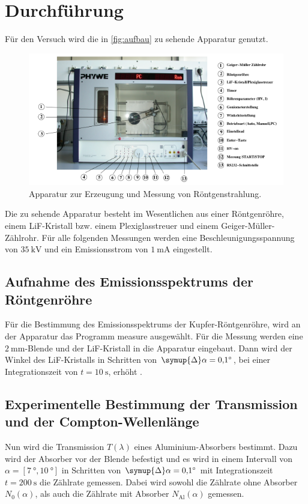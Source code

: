 \section{Durchführung}
\label{sec:Durchführung}
Für den Versuch wird die in \autoref{fig:aufbau} zu sehende Apparatur genutzt.
\begin{figure}[H]
    \centering
    \includegraphics[width=\textwidth]{images/aufbau.PNG}
    \caption{Apparatur zur Erzeugung und Messung von Röntgenstrahlung. \cite{603}}
    \label{fig:aufbau}
\end{figure}
\noindent Die zu sehende Apparatur besteht im Wesentlichen aus einer Röntgenröhre,
einem LiF-Kristall bzw. einem Plexiglasstreuer und einem Geiger-Müller-Zählrohr. Für alle folgenden Messungen werden eine Beschleunigungsspannung von $\SI{35}{\kilo\volt}$ und ein Emissionsstrom von $\SI{1}{\milli\ampere}$ eingestellt.

\subsection{Aufnahme des Emissionsspektrums der Röntgenröhre}
Für die Bestimmung des Emissionsspektrums der Kupfer-Röntgenröhre, wird an der Apparatur das Programm measure ausgewählt. Für die Messung werden eine $\SI{2}{\milli\meter}$-Blende und der LiF-Kristall in die Apparatur eingebaut.
Dann wird der Winkel des LiF-Kristalls in Schritten von $\symup{\Delta}\alpha = \SI{0.1}{\degree}$, bei einer Integrationszeit von $t = \SI{10}{\second}$, erhöht .

\subsection{Experimentelle Bestimmung der Transmission und der Compton-Wellenlänge}
Nun wird die Transmission $T(\lambda)$ eines Aluminium-Absorbers bestimmt.
    Dazu wird der Absorber vor der Blende befestigt und  es wird in einem Intervall von $\alpha = [\SI{7}{\degree}, \SI{10}{\degree}]$ in Schritten von $\symup{\Delta}\alpha = \SI{0.1}{\degree}$ mit Integrationszeit $t = \SI{200}{\second}$ die Zählrate gemessen.
    Dabei wird sowohl die Zählrate ohne Absorber $N_0(\alpha)$, als auch die Zählrate mit Absorber $N_\text{Al}(\alpha)$ gemessen.

